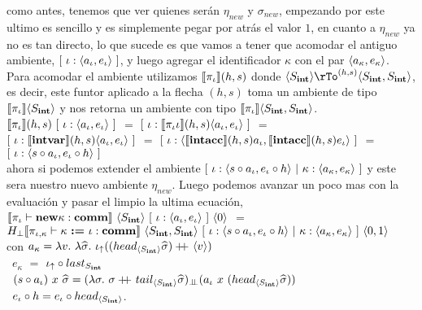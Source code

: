 como antes, tenemos que ver quienes ser\'an $\eta_{new}$ y $\sigma_{new}$, empezando por
este ultimo es sencillo y es simplemente pegar por atr\'as el valor $1$, en cuanto a
$\eta_{new}$ ya no es tan directo, lo que sucede es que vamos a tener que acomodar el
antiguo ambiente, $[ \ \iota : \langle a_\iota,e_\iota \rangle \ ]$, y luego agregar
el identificador $\kappa$ con el par $\langle a_\kappa,e_\kappa \rangle$.\\
Para acomodar el ambiente utilizamos 
$\llbracket \pi_\iota \rrbracket(h,s)$ donde $\lrangles{S_\intt} \rTo^{(h,s)} \lrangles{S_\intt,S_\intt}$,
es decir, este funtor aplicado a la flecha $(h,s)$ toma un ambiente de tipo
$\llbracket \pi_\iota \rrbracket\langle S_{\textbf{int}} \rangle$ y nos retorna un ambiente con tipo 
$\llbracket \pi_\iota \rrbracket\langle S_{\textbf{int}},S_{\textbf{int}} \rangle$.\\

$\llbracket \pi_\iota \rrbracket(h,s) \ [ \ \iota : \langle a_\iota,e_\iota \rangle \ ]$ $=$
$[ \ \iota : \llbracket \pi_\iota \iota \rrbracket(h,s) \langle a_\iota,e_\iota \rangle \ ]$ $=$\\

\indent
$[ \ \iota : \llbracket \textbf{intvar} \rrbracket(h,s) \langle a_\iota,e_\iota \rangle \ ]$ $=$
$[ \ \iota : \langle \llbracket \textbf{intacc} \rrbracket(h,s) a_\iota,\llbracket \textbf{intacc} \rrbracket(h,s)e_\iota \rangle \ ]$ $=$\\

\indent
$[ \ \iota : \langle s \circ a_\iota,e_\iota \circ h \rangle \ ]$\\

ahora si podemos extender el ambiente 
$[ \ \iota : \lrangles{s \circ a_\iota,e_\iota \circ h} \ | \
	\kappa : \lrangles{a_\kappa,e_\kappa}\ ]$ y este sera nuestro nuevo ambiente $\eta_{new}$.
Luego podemos avanzar un poco mas con la evaluaci\'on y pasar el limpio la ultima ecuaci\'on,\\

\noindent
$\semBrcks{\pi_\iota \vdash \cnew \kappa : \commt}
	\ \lrangles{S_\intt} \ 
	[ \ \iota : \lrangles{a_\iota,e_\iota} \ ] \ \lrangles{0}$ $=$ \\
	\indent 
	$H_{\bot} 
	\llbracket \pi_{\iota,\kappa} \vdash \kappa \ \textbf{:=} \ \iota: \textbf{comm} \rrbracket
		\ \langle S_{\textbf{int}},S_{\textbf{int}} \rangle
		\ [ \ \iota : \langle s \circ a_\iota,e_\iota \circ h \rangle \ | \
			\kappa : \langle a_\kappa,e_\kappa \rangle\ ] 
		\ \langle 0,1 \rangle$\\

con $a_\kappa = \lambda v. \ \lambda \widehat{\sigma} . \ \iota_{\uparrow} 
				((head_{\langle S_{\textbf{int}} \rangle} \widehat{\sigma}) +\kern-1.3ex+\kern0.8ex \langle v \rangle)$\\
\indent \indent \ 
	$e_\kappa$ $=$ $ \iota_{\uparrow} \circ last_{S_{\textbf{int}}}$\\
\indent \indent \ 
	$(s \circ a_\iota) \ x \ \widehat{\sigma} = 
		(\lambda \sigma . \ \sigma +\kern-1.3ex+\kern0.8ex tail_{\langle S_{\textbf{int}} \rangle}\widehat{\sigma})_{\bot \!\!\! \bot} 
			(a_\iota \ x \ (head_{\langle S_{\textbf{int}} \rangle} \widehat{\sigma}))$\\
\indent \indent \ 
	$e_\iota \circ h = e_\iota \circ head_{\langle S_{\textbf{int}} \rangle}$.\\
	

